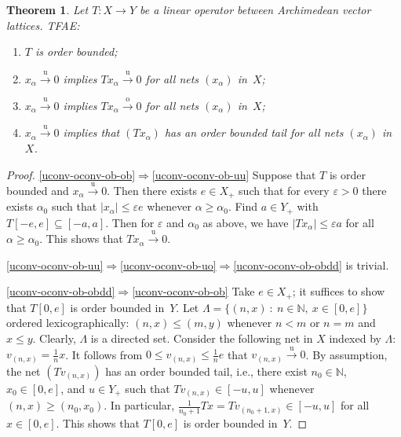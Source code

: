\documentclass[12pt]{amsart}
\theoremstyle{plain}
\newtheorem{theorem}{Theorem}[section]
\theoremstyle{definition}
\newcommand{\abs}[1]{\lvert#1\rvert}
\renewcommand{\mid}{\::\:}
\newcommand{\goeso}{\xrightarrow{\mathrm{o}}}	%
\newcommand{\goesu}{\xrightarrow{\mathrm{u}}} %
\renewcommand{\le}{\leqslant}
\renewcommand{\ge}{\geqslant}
\begin{document}

\begin{theorem}\label{uconv-oconv-ob}
  Let $T\colon X\to Y$ be a linear operator between Archimedean vector
  lattices. TFAE:
  \begin{enumerate}
  \item\label{uconv-oconv-ob-ob} $T$ is order bounded;
  \item\label{uconv-oconv-ob-uu} $x_\alpha\goesu 0$ implies
    $Tx_\alpha\goesu 0$ for all nets $(x_\alpha)$ in~$X$;
  \item\label{uconv-oconv-ob-uo} $x_\alpha\goesu 0$ implies
    $Tx_\alpha\goeso 0$ for all nets $(x_\alpha)$ in~$X$;
  \item\label{uconv-oconv-ob-obdd} $x_\alpha\goesu 0$ implies
    that $(Tx_\alpha)$ has an order bounded tail for all nets $(x_\alpha)$ in~$X$.
  \end{enumerate}
\end{theorem}

\begin{proof}
  \eqref{uconv-oconv-ob-ob}$\Rightarrow$\eqref{uconv-oconv-ob-uu}
  Suppose that $T$ is order bounded and
  $x_\alpha\goesu 0$. Then there exists $e\in X_+$ such that for every
  $\varepsilon>0$ there exists $\alpha_0$ such that
  $\abs{x_\alpha}\le\varepsilon e$ whenever $\alpha\ge\alpha_0$. Find
  $a\in Y_+$ with $T[-e,e]\subseteq[-a,a]$. Then for
  $\varepsilon$ and $\alpha_0$ as above, we have
  $\abs{Tx_\alpha}\le\varepsilon a$ for all $\alpha\ge\alpha_0$. This
  shows that $Tx_\alpha\goesu 0$.

  \eqref{uconv-oconv-ob-uu}$\Rightarrow$\eqref{uconv-oconv-ob-uo}$\Rightarrow$\eqref{uconv-oconv-ob-obdd}  is
 trivial.

 \eqref{uconv-oconv-ob-obdd}$\Rightarrow$\eqref{uconv-oconv-ob-ob} Take
 $e\in X_+$; it suffices to show that $T[0,e]$ is order bounded in~$Y$. Let
  \begin{math}
    \Lambda=\bigl\{(n,x)\mid n\in\mathbb N,\ x\in[0,e]\bigr\}
  \end{math}
  ordered lexicographically: $(n,x)\le(m,y)$ whenever $n< m$ or $n=m$
  and $x\le y$. Clearly, $\Lambda$ is a directed set. Consider the
  following net in $X$ indexed by $\Lambda$:
  $v_{(n,x)}=\frac{1}{n}x$. It follows from
  $0\le v_{(n,x)}\le\frac1n e$ that $v_{(n,x)}\goesu 0$. By
  assumption, the net $(Tv_{(n,x)})$ has an order bounded tail, i.e.,
  there exist $n_0\in\mathbb N$, $x_0\in[0,e]$, and $u\in Y_+$ such
  that $Tv_{(n,x)}\in[-u,u]$ whenever $(n,x)\ge(n_0,x_0)$. In
  particular, $\frac{1}{n_0+1}Tx=Tv_{(n_0+1,x)}\in[-u,u]$ for all
  $x\in[0,e]$. This shows that $T[0,e]$ is order bounded in~$Y$.
\end{proof}
\end{document}
